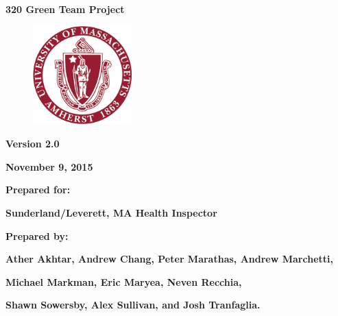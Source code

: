 \documentclass[twoside,letterpaper]{article}
\begin{document}
\clearpage\setcounter{page}{1}\pagestyle{Standard}
\thispagestyle{FirstPage}


\bigskip

{\centering{}\bfseries\color{black}
320 Green Team Project
\par}


\bigskip


\begin{figure}
\centering
\includegraphics[width=1.5in,height=1.5in]{Uma_seal.png}
\end{figure}

\bigskip


\bigskip

{\centering{}\bfseries\color{black}
Version 2.0
\par}

{\centering{}\bfseries\color{black}
November 9, 2015
\par}


\bigskip


\bigskip

{\centering{}\bfseries\color{black}
Prepared for:
\par}

{\centering{}\bfseries\color{black}
Sunderland/Leverett, MA Health Inspector
\par}


\bigskip


\bigskip

{\centering{}\bfseries\color{black}
Prepared by:
\par}

{\centering{}\bfseries\color{black}
Ather Akhtar, Andrew Chang, Peter Marathas, Andrew Marchetti, \par} 
{\centering{}\bfseries\color{black}
 Michael Markman, Eric Maryea, Neven Recchia,
\par}
{\centering{}\bfseries\color{black}
Shawn Sowersby, Alex Sullivan, and Josh Tranfaglia.\par}
\end{document}
